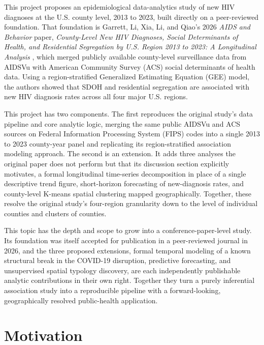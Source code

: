 \documentclass[11pt,letterpaper]{article}
\begin{document}
This project proposes an epidemiological data-analytics study of new HIV diagnoses at the U.S. county level, 2013 to 2023, built directly on a peer-reviewed foundation. That foundation is Garrett, Li, Xia, Li, and Qiao's 2026 \textit{AIDS and Behavior} paper, \textit{County-Level New HIV Diagnoses, Social Determinants of Health, and Residential Segregation by U.S. Region 2013 to 2023: A Longitudinal Analysis} \cite{garrett2026}, which merged publicly available county-level surveillance data from AIDSVu with American Community Survey (ACS) social determinants of health data. Using a region-stratified Generalized Estimating Equation (GEE) model, the authors showed that SDOH and residential segregation are associated with new HIV diagnosis rates across all four major U.S. regions.

This project has two components. The first reproduces the original study's data pipeline and core analytic logic, merging the same public AIDSVu and ACS sources on Federal Information Processing System (FIPS) codes into a single 2013 to 2023 county-year panel and replicating its region-stratified association modeling approach. The second is an extension. It adds three analyses the original paper does not perform but that its discussion section explicitly motivates, a formal longitudinal time-series decomposition in place of a single descriptive trend figure, short-horizon forecasting of new-diagnosis rates, and county-level K-means spatial clustering mapped geographically. Together, these resolve the original study's four-region granularity down to the level of individual counties and clusters of counties.

This topic has the depth and scope to grow into a conference-paper-level study. Its foundation was itself accepted for publication in a peer-reviewed journal in 2026, and the three proposed extensions, formal temporal modeling of a known structural break in the COVID-19 disruption, predictive forecasting, and unsupervised spatial typology discovery, are each independently publishable analytic contributions in their own right. Together they turn a purely inferential association study into a reproducible pipeline with a forward-looking, geographically resolved public-health application.

\section{Motivation}
\end{document}
